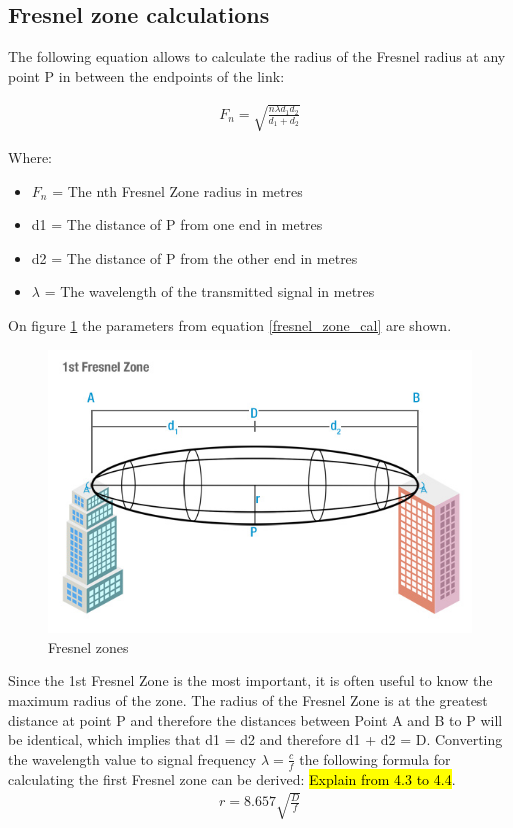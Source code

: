 \subsection{Fresnel zone calculations}
The following equation allows to calculate the radius of the Fresnel radius at any point P in between the endpoints of the link: 

\begin{align}
F_n = \sqrt{\frac{n \lambda d_1 d_2}{d_1+d_2}} \label{fresnel_zone_cal}
\end{align}

Where:
\begin{itemize}[label=]
\item $F_n$ = The nth Fresnel Zone radius in metres
\item d1 = The distance of P from one end in metres
\item d2 = The distance of P from the other end in metres
\item $\lambda$ = The wavelength of the transmitted signal in metres
\end{itemize}

\noindent On figure \ref{fig:fresnel_zones} the parameters from equation \ref{fresnel_zone_cal} are shown. 
\begin{figure}[H]
	\centering
	\includegraphics[scale=0.70]{figures/fresnel_zone.jpg}
	\caption{Fresnel zones}
	\label{fig:fresnel_zones}
\end{figure}  

Since the 1st Fresnel Zone is the most important, it is often useful to know the maximum radius of the zone. The radius of the Fresnel Zone is at the greatest distance at point P and therefore the distances between Point A and B to P will be identical, which implies that d1 = d2 and therefore d1 + d2 = D. Converting the wavelength value to signal frequency $\lambda = \frac{c}{f}$ the following formula for calculating the first Fresnel zone can be derived: \hl{Explain from 4.3 to 4.4}.
\begin{align}
r= 8.657 \sqrt{\frac{D}{f}} \label{eq:fresnel_radius}
\end{align}


